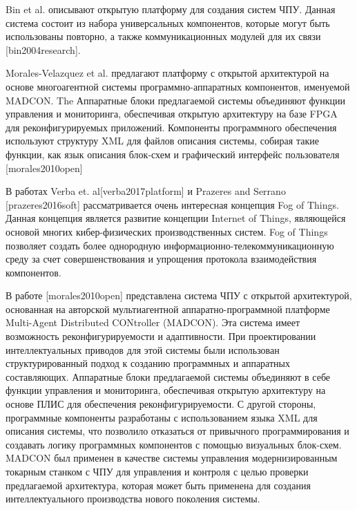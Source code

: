 Bin et al. описывают открытую платформу для создания систем ЧПУ. Данная система состоит из набора универсальных компонентов, которые могут быть использованы повторно, а также коммуникационных модулей для их связи [bin2004research].

Morales-Velazquez et al. предлагают платформу с открытой архитектурой на основе многоагентной системы программно-аппаратных компонентов, именуемой MADCON. The Аппаратные блоки предлагаемой системы объединяют функции управления и мониторинга, обеспечивая открытую архитектуру на базе FPGA для реконфигурируемых приложений. Компоненты программного обеспечения используют структуру XML для файлов описания системы, собирая такие функции, как язык описания блок-схем и графический интерфейс пользователя [morales2010open] 

В работах Verba et. al[verba2017platform] и  Prazeres and Serrano [prazeres2016soft] рассматривается очень интересная концепция Fog of Things. Данная концепция является развитие концепции Internet of Things, являющейся основой многих кибер-физических производственных систем. Fog of Things позволяет создать более однородную информационно-телекоммуникационную среду за счет совершенствования и упрощения протокола взаимодействия компонентов.

В работе [morales2010open] представлена система ЧПУ с открытой архитектурой, основанная на авторской мультиагентной аппаратно-программной платформе Multi-Agent Distributed CONtroller (MADCON). Эта система имеет возможность реконфигурируемости и адаптивности. При проектировании интеллектуальных приводов для этой системы были использован структурированный подход к созданию программных и аппаратных составляющих. Аппаратные блоки предлагаемой системы объединяют в себе функции управления и мониторинга, обеспечивая открытую архитектуру на основе ПЛИС для обеспечения реконфигурируемости. С другой стороны, программные компоненты разработаны с использованием языка XML для описания системы, что позволило отказаться от привычного программирования и создавать логику программных компонентов с помощью визуальных блок-схем. MADCON был применен в качестве системы управления модернизированным токарным станком с ЧПУ для управления и контроля с целью проверки предлагаемой архитектура, которая может быть применена для создания интеллектуального производства нового поколения системы.

